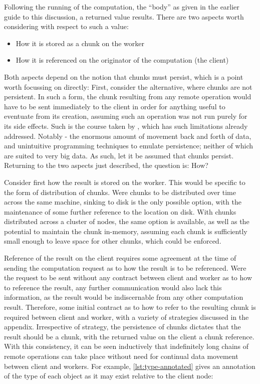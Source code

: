 Following the running of the computation, the ``body'' as given in the
earlier guide to this discussion, a returned value results. There are
two aspects worth considering with respect to such a value:

\begin{itemize}
    \item
          How it is stored as a chunk on the worker
    \item
          How it is referenced on the originator of the computation (the client)
\end{itemize}

Both aspects depend on the notion that chunks must persist, which is a
point worth focussing on directly: First, consider the alternative,
where chunks are not persistent. In such a form, the chunk resulting
from any remote operation would have to be sent immediately to the
client in order for anything useful to eventuate from its creation,
assuming such an operation was not run purely for its side effects. Such
is the course taken by , which has such limitations already
addressed. Notably - the enormous amount of movement back and forth of
data, and unintuitive programming techniques to emulate persistence;
neither of which are suited to very big data. As such, let it be assumed
that chunks persist. Returning to the two aspects just described, the
question is: How?

Consider first how the result is stored on the worker. This would be
specific to the form of distribution of chunks. Were chunks to be
distributed over time across the same machine, sinking to disk is the
only possible option, with the maintenance of some further reference to
the location on disk. With chunks distributed across a cluster of nodes,
the same option is available, as well as the potential to maintain the
chunk in-memory, assuming each chunk is sufficiently small enough to
leave space for other chunks, which could be enforced.

Reference of the result on the client requires some agreement at the
time of sending the computation request as to how the result is to be
referenced. Were the request to be sent without any contract between
client and worker as to how to reference the result, any further
communication would also lack this information, as the result would be
indiscernable from any other computation result. Therefore, some initial
contract as to how to refer to the resulting chunk is required between
client and worker, with a variety of strategies discussed in the
appendix. Irrespective of strategy, the persistence of chunks dictates
that the result should be a chunk, with the returned value on the client
a chunk reference. With this consistency, it can be seen inductively
that indefinitely long chains of remote operations can take place
without need for continual data movement between client and workers. For
example, \cref{lst:type-annotated} gives an annotation of the type of each
object as it may exist relative to the client node:

